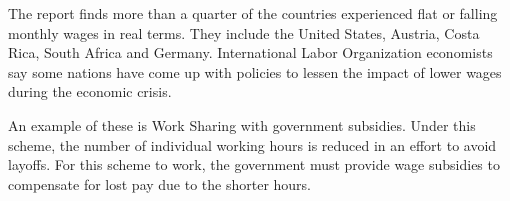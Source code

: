 The report finds more than a quarter of the countries experienced
flat or falling monthly wages in real terms. They
include the United States, Austria, Costa Rica, South Africa
and Germany. International Labor Organization economists
say some nations have come up with policies to lessen
the impact of lower wages during the economic crisis.

An example of these is Work Sharing with government
subsidies. Under this scheme, the number of individual
working hours is reduced in an effort to avoid layoffs. For
this scheme to work, the government must provide wage
subsidies to compensate for lost pay due to the shorter
hours.